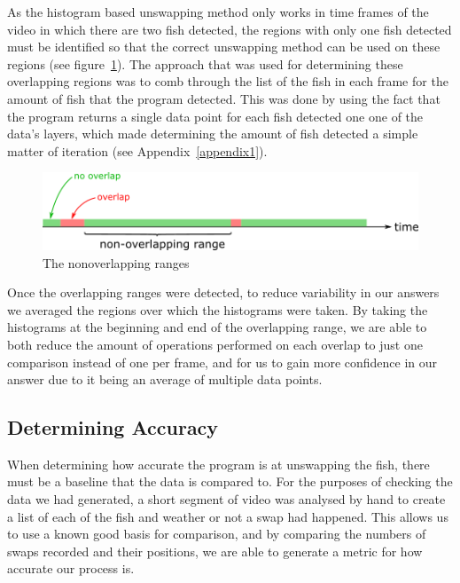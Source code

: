 \documentclass{article}
\begin{document}
As the histogram based unswapping method only works in time frames of the video in which there are two fish detected, the regions with only one fish detected must be identified so that the correct unswapping method can be used on these regions (see figure~\ref{fig:nonoverlappingRange}). The approach that was used for determining these overlapping regions was to comb through the list of the fish in each frame for the amount of fish that the program detected. This was done by using the fact that the program returns a single data point for each fish detected one one of the data's layers, which made determining the amount of fish detected a simple matter of iteration (see Appendix~\ref{appendix1}).

\begin{figure}[H]
	\centering
	\includegraphics[width=\linewidth]{nonoverlappingRange}
	\caption{The nonoverlapping ranges}
	\label{fig:nonoverlappingRange}
\end{figure}

Once the overlapping ranges were detected, to reduce variability in our answers we averaged the regions over which the histograms were taken. By taking the histograms at the beginning and end of the overlapping range, we are able to both reduce the amount of operations performed on each overlap to just one comparison instead of one per frame, and for us to gain more confidence in our answer due to it being an average of multiple data points.

\subsection{Determining Accuracy}

When determining how accurate the program is at unswapping the fish, there must be a baseline that the data is compared to. For the purposes of checking the data we had generated, a short segment of video was analysed by hand to create a list of each of the fish and weather or not a swap had happened. This allows us to use a known good basis for comparison, and by comparing the numbers of swaps recorded and their positions, we are able to generate a metric for how accurate our process is.
\end{document}
